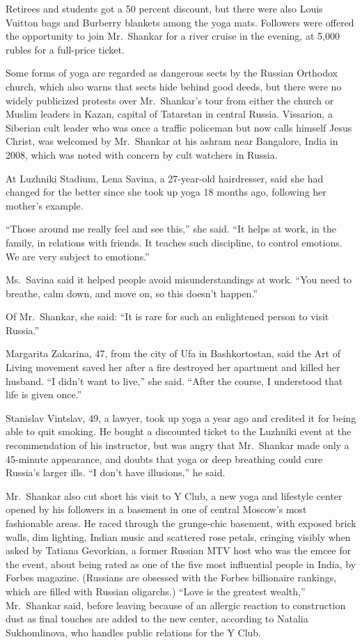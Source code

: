 ﻿\documentclass[12pt]{article}
\begin{document}
Retirees and students got a 50 percent discount, but there were also Louis Vuitton bags and Burberry
blankets among the yoga mats. Followers were offered the opportunity to join Mr.~Shankar for a river
cruise in the evening, at 5,000 rubles for a full-price ticket.

Some forms of yoga are regarded as dangerous sects by the Russian Orthodox church, which also warns
that sects hide behind good deeds, but there were no widely publicized protests over Mr.~Shankar's
tour from either the church or Muslim leaders in Kazan, capital of Tatarstan in central Russia.
Vissarion, a Siberian cult leader who was once a traffic policeman but now calls himself Jesus
Christ, was welcomed by Mr.~Shankar at his ashram near Bangalore, India in 2008, which was noted
with concern by cult watchers in Russia.

At Luzhniki Stadium, Lena Savina, a 27-year-old hairdresser, said she had changed for the better
since she took up yoga 18 months ago, following her mother's example.

``Those around me really feel and see this,'' she said. ``It helps at work, in the family, in
relations with friends. It teaches such discipline, to control emotions. We are very subject to
emotions.''

Ms.~Savina said it helped people avoid misunderstandings at work. ``You need to breathe, calm down,
and move on, so this doesn't happen.''

Of Mr.~Shankar, she said: ``It is rare for such an enlightened person to visit Russia.''

Margarita Zakarina, 47, from the city of Ufa in Bashkortostan, said the Art of Living movement saved
her after a fire destroyed her apartment and killed her husband. ``I didn't want to live,'' she
said. ``After the course, I understood that life is given once.''

Stanislav Vintslav, 49, a lawyer, took up yoga a year ago and credited it for being able to quit
smoking. He bought a discounted ticket to the Luzhniki event at the recommendation of his
instructor, but was angry that Mr.~Shankar made only a 45-minute appearance, and doubts that yoga or
deep breathing could cure Russia's larger ills. ``I don't have illusions,'' he said.

Mr.~Shankar also cut short his visit to Y Club, a new yoga and lifestyle center opened by his
followers in a basement in one of central Moscow's most fashionable areas. He raced through the
grunge-chic basement, with exposed brick walls, dim lighting, Indian music and scattered rose
petals, cringing visibly when asked by Tatiana Gevorkian, a former Russian MTV host who was the
emcee for the event, about being rated as one of the five most influential people in India, by
Forbes magazine. (Russians are obsessed with the Forbes billionaire rankings, which are filled with
Russian oligarchs.) ``Love is the greatest wealth,'' Mr.~Shankar said, before leaving because of an
allergic reaction to construction dust as final touches are added to the new center, according to
Natalia Sukhomlinova, who handles public relations for the Y Club.
\end{document}
